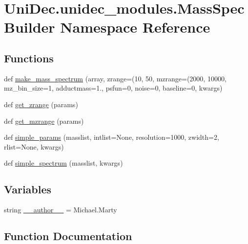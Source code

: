 \hypertarget{namespace_uni_dec_1_1unidec__modules_1_1_mass_spec_builder}{}\section{Uni\+Dec.\+unidec\+\_\+modules.\+Mass\+Spec\+Builder Namespace Reference}
\label{namespace_uni_dec_1_1unidec__modules_1_1_mass_spec_builder}
\subsection*{Functions}
\begin{DoxyCompactItemize}
\item 
def \hyperlink{namespace_uni_dec_1_1unidec__modules_1_1_mass_spec_builder_a065f332d5df64bdcee00227f0f5db534}{make\+\_\+mass\+\_\+spectrum} (array, zrange=(10, 50, mzrange=(2000, 10000, mz\+\_\+bin\+\_\+size=1, adductmass=1., psfun=0, noise=0, baseline=0, kwargs)
\item 
def \hyperlink{namespace_uni_dec_1_1unidec__modules_1_1_mass_spec_builder_a71e3130f804b35d4c9b3f174eb05d48e}{get\+\_\+zrange} (params)
\item 
def \hyperlink{namespace_uni_dec_1_1unidec__modules_1_1_mass_spec_builder_a3d7d68f7f63f8344acc84173a111dee5}{get\+\_\+mzrange} (params)
\item 
def \hyperlink{namespace_uni_dec_1_1unidec__modules_1_1_mass_spec_builder_a68a56f7d194609098c629337a8fee292}{simple\+\_\+params} (masslist, intlist=None, resolution=1000, zwidth=2, rlist=None, kwargs)
\item 
def \hyperlink{namespace_uni_dec_1_1unidec__modules_1_1_mass_spec_builder_a4887a91443775a45b8a6be793aa8d7cd}{simple\+\_\+spectrum} (masslist, kwargs)
\end{DoxyCompactItemize}
\subsection*{Variables}
\begin{DoxyCompactItemize}
\item 
string \hyperlink{namespace_uni_dec_1_1unidec__modules_1_1_mass_spec_builder_ac1c801065364ed30a987ed27282bae77}{\+\_\+\+\_\+author\+\_\+\+\_\+} = \textquotesingle{}Michael.\+Marty\textquotesingle{}
\end{DoxyCompactItemize}


\subsection{Function Documentation}
\hypertarget{namespace_uni_dec_1_1unidec__modules_1_1_mass_spec_builder_a3d7d68f7f63f8344acc84173a111dee5}{}
